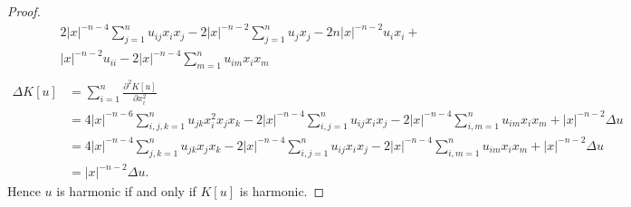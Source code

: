 \documentclass[a4paper]{ctexart}
\begin{document}
\begin{proof}
\begin{align*}
&2|x|^{-n-4}\sum_{j=1}^{n}u_{ij}x_ix_j-2|x|^{-n-2}\sum_{j=1}^{n}u_jx_j-2n|x|^{-n-2}u_ix_i+\\
&|x|^{-n-2}u_{ii}-2|x|^{-n-4}\sum_{m=1}^{n}u_{im}x_ix_m\\
\end{align*}
\begin{align*}
\Delta K[u]
&=\sum_{i=1}^{n}\frac{\partial^2 K[u]}{\partial x_i^2}\\
&=4|x|^{-n-6}\sum_{i,j,k=1}^{n}u_{jk}x_i^2x_jx_k-2|x|^{-n-4}\sum_{i,j=1}^{n}u_{ij}x_ix_j-
2|x|^{-n-4}\sum_{i,m=1}^{n}u_{im}x_ix_m+|x|^{-n-2}\Delta u\\
&=4|x|^{-n-4}\sum_{j,k=1}^{n}u_{jk}x_jx_k-2|x|^{-n-4}\sum_{i,j=1}^{n}u_{ij}x_ix_j-
2|x|^{-n-4}\sum_{i,m=1}^{n}u_{im}x_ix_m+|x|^{-n-2}\Delta u\\
&=|x|^{-n-2}\Delta u.
\end{align*}
Hence $u$ is harmonic if and only if $K[u]$ is harmonic.
\end{proof}
\end{document}
